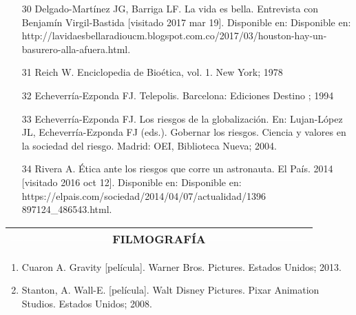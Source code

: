 \documentclass[12pt,letterpaper]{article}
\begin{document}
\begin{multicols}{2}
\begin{itemize}
    \item[30] {\scriptsize Delgado-Martínez JG, Barriga LF. La vida es bella. Entrevista con Benjamín Virgil-Bastida [visitado 2017 mar 19]. Disponible en: Disponible en: http://lavidaesbellaradioucm.blogspot.com.co/2017/03/houston-hay-un-basurero-alla-afuera.html.}
    
    \item[31] {\scriptsize Reich W. Enciclopedia de Bioética, vol. 1. New York; 1978}
    
    \item[32] {\scriptsize Echeverría-Ezponda FJ. Telepolis. Barcelona: Ediciones Destino ; 1994}
    
    \item[33] {\scriptsize Echeverría-Ezponda FJ. Los riesgos de la globalización. En: Lujan-López JL, Echeverría-Ezponda FJ (eds.). Gobernar los riesgos. Ciencia y valores en la sociedad del riesgo. Madrid: OEI, Biblioteca Nueva; 2004.}
    
    \item[34] {\scriptsize Rivera A. Ética ante los riesgos que corre un astronauta. El País. 2014 [visitado 2016 oct 12]. Disponible en: Disponible en: 
    https://elpais.com/sociedad/2014/04/07/actualidad/1396
    897124_486543.html.}
    
   \end{itemize}
   \begin{center}
\begin{tabular}{c}\hline
    \noindent \small {\textcolor{white}{------------------------}FILMOGRAFÍA\textcolor{white}{------------------------}} \\\hline
\end{tabular}

\end{center}
  
    \begin{enumerate}
        \item {\scriptsize Cuaron A. Gravity [película]. Warner Bros. Pictures. Estados Unidos; 2013.}
        \item{\scriptsize Stanton, A. Wall-E. [película]. Walt Disney Pictures. Pixar Animation Studios. Estados Unidos; 2008.}
    \end{enumerate}
\end{multicols}
\end{document}
